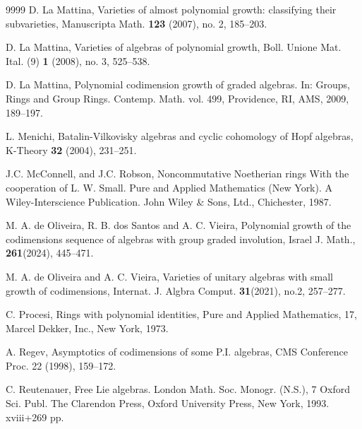 \documentclass{amsart}
\theoremstyle{definition}
\theoremstyle{remark}
\numberwithin{equation}{section}
\begin{document}
\begin{thebibliography}{9999}
D. La Mattina, 
Varieties of almost polynomial growth: classifying their subvarieties,
Manuscripta Math. {\bf 123} (2007), no. 2, 185--203. 
	
D. La Mattina, 
Varieties of algebras of polynomial growth, 
Boll. Unione Mat. Ital. (9) {\bf 1} (2008), no. 3, 525--538.

D. La Mattina,
Polynomial codimension growth of graded algebras. 
In: Groups, Rings and Group Rings. Contemp. Math. vol. 499, Providence, RI, AMS, 2009, 189–197.


L. Menichi,
Batalin-Vilkovisky algebras and cyclic cohomology of Hopf algebras,
K-Theory \textbf{32} (2004), 231--251.
	
	
	
J.C. McConnell, and J.C. Robson,
Noncommutative Noetherian rings With the cooperation of L. W. Small.
Pure and Applied Mathematics (New York). A Wiley-Interscience Publication.
John Wiley \& Sons, Ltd., Chichester, 1987.

M. A. de Oliveira, R. B. dos Santos and A. C. Vieira,
Polynomial growth of the codimensions sequence of algebras with group graded involution,
Israel J. Math., \textbf{261}(2024), 445--471.
	
M. A. de Oliveira and A. C. Vieira,
Varieties of unitary algebras with small growth of codimensions,
Internat. J. Algbra Comput. \textbf{31}(2021), no.2, 257--277.
	
C. Procesi, 
Rings with polynomial identities, Pure and Applied Mathematics, 17, Marcel
Dekker, Inc., New York, 1973.
	
	


A. Regev, 
Asymptotics of codimensions of some P.I. algebras, 
CMS Conference Proc. 22
(1998), 159--172.





C. Reutenauer, 
Free Lie algebras.
London Math. Soc. Monogr. (N.S.), 7
Oxford Sci. Publ.
The Clarendon Press, Oxford University Press, New York, 1993. xviii+269 pp.



\end{thebibliography}
\end{document}
